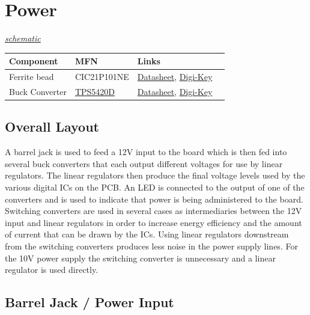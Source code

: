 \section{Power}
\label{sec:power}
\textit{\hyperlink{schematic.8}{schematic}}

\label{tab:power-schematic-components}
\begin{tabularx}{\textwidth}{l l X>{\raggedright\arraybackslash}X}
        \toprule
        \textbf{Component} & \textbf{MFN} & \textbf{Links} \\
        \midrule
        \endhead

        Ferrite bead & CIC21P101NE &
        \href{http://www.samsungsem.com/kr/support/product-search/bead/__icsFiles/afieldfile/2014/11/13/S_CIC21P101NE.pdf}{Datasheet},
        \href{https://www.digikey.com/product-detail/en/mpd-memory-protection-devices/EJ508A/EJ508A-ND/2439547}{Digi-Key}
        \\
        Buck Converter & \hyperlink{sec:tps5420d}{TPS5420D} &
        \href{http://www.ti.com/lit/ds/symlink/tps5420.pdf}{Datasheet},
        \href{https://www.digikey.com/product-detail/en/texas-instruments/TPS5420DR/296-31984-1-ND/3505318}{Digi-Key}
        \\

        \bottomrule
\end{tabularx}

\subsection{Overall Layout}
\label{sec:power-overall-layout}

A barrel jack is used to feed a 12V input to the board which is then fed into several buck converters that each output
different voltages for use by linear regulators. The linear regulators then produce the final voltage levels used by the
various digital ICs on the PCB. An LED is connected to the output of one of the converters and is used to indicate that
power is being administered to the board. Switching converters are used in several cases as intermediaries between the
12V input and linear regulators in order to increase energy efficiency and the amount of current that can be drawn by
the ICs. Using linear regulators downstream from the switching converters produces less noise in the power supply
lines. For the 10V power supply the switching converter is unnecessary and a linear regulator is used directly.

\subsection{Barrel Jack / Power Input}
\label{sec:power-input}

